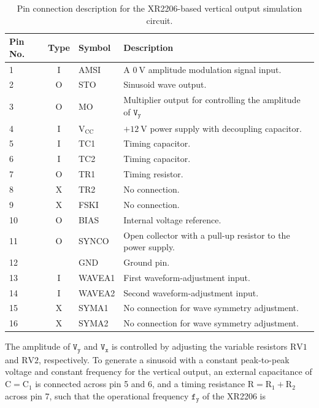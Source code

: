 \documentclass[class=report,11pt,crop=false]{standalone}
\begin{document}
		\begin{table}[ht!]
		\caption{Pin connection description for the XR2206-based vertical output simulation circuit.}
		\label{tab:voec-pin-description}
		\centering
		\begin{tabular}{|m{3em}|c|m{10em}|m{18em}|}
			\hline
			\cellcolor{cyan!25}\textbf{Pin No.} & \cellcolor{cyan!25}\textbf{Type}	& \cellcolor{cyan!25}\textbf{Symbol} & \cellcolor{cyan!25}\textbf{Description} \\
			\hline
			1	&	I	& AMSI 	& A $\SI{0}{\volt}$ amplitude modulation signal input.\\
			\hline
			2	&   O	& STO	&	Sinusoid wave output.\\
			\hline
			3	& 	O	& MO	&	Multiplier output for controlling the amplitude of $\texttt{V}_\texttt{y}$\\
			\hline
			4	& 	I	& $\text{V}_{\text{CC}}$ & $+\SI{12}{\volt}$ power supply with decoupling capacitor.\\
			\hline
			5	& 	I	& TC1	&	Timing capacitor.\\
			\hline
			6	&	I	& TC2	& 	Timing capacitor.\\
			\hline
			7	&	O	& TR1	&	Timing resistor.\\
			\hline
			8	&	X	& TR2	&	 No connection.\\
			\hline
			9	&	X	& FSKI	&	No connection.\\  
			\hline
			10	&	O	& BIAS	&	 Internal voltage reference.\\
			\hline
			11	&	O	& SYNCO	&	 Open collector with a pull-up resistor to the power
			supply.\\
			\hline
			12	& 		& GND		& Ground pin.\\
			\hline
			13	&	I	& WAVEA1	&	 First waveform-adjustment input.\\
			\hline
			14	&	I	& WAVEA2	&	Second waveform-adjustment input.\\
			\hline
			15	&	X	& SYMA1		&	 No connection for wave symmetry adjustment.\\
			\hline
			16	&	X	& SYMA2		&	 No connection for wave symmetry adjustment.\\
			\hline
		\end{tabular}
	\end{table}
	The amplitude of $\texttt{V}_\texttt{y}$ and $\texttt{V}_\texttt{x}$ is controlled by adjusting the variable resistors $\text{RV1}$ and $\text{RV2}$, respectively.	To generate a sinusoid with a constant peak-to-peak voltage and constant frequency for the vertical output, an external capacitance of $\text{C} = \text{C}_1$ is connected across pin 5 and 6, and a timing resistance $\text{R} = \text{R}_1 + \text{R}_2$ across pin 7, such that the operational frequency $\texttt{f}_\texttt{y}$ of the XR2206 is 
\end{document}
